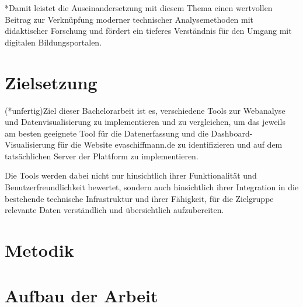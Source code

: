*Damit leistet die Auseinandersetzung mit diesem Thema einen wertvollen Beitrag
zur Verknüpfung moderner technischer Analysemethoden mit didaktischer Forschung
und fördert ein tieferes Verständnis für den Umgang mit digitalen Bildungsportalen.

\section{Zielsetzung}
\label{sec:zielsetzung}

(*unfertig)Ziel dieser Bachelorarbeit ist es, verschiedene Tools zur Webanalyse und Datenvisualisierung zu implementieren und zu vergleichen, um das jeweils am besten geeignete Tool für die Datenerfassung und die Dashboard-Visualisierung für die Website evaschiffmann.de zu identifizieren und auf dem tatsächlichen Server der Plattform zu implementieren.

Die Tools werden dabei nicht nur hinsichtlich ihrer Funktionalität und Benutzerfreundlichkeit bewertet, sondern auch hinsichtlich ihrer Integration in die bestehende technische Infrastruktur und ihrer Fähigkeit, für die Zielgruppe relevante Daten verständlich und übersichtlich aufzubereiten.

\section{Metodik}
\label{sec:metodik}

\section{Aufbau der Arbeit}
\label{sec:aufbau}


